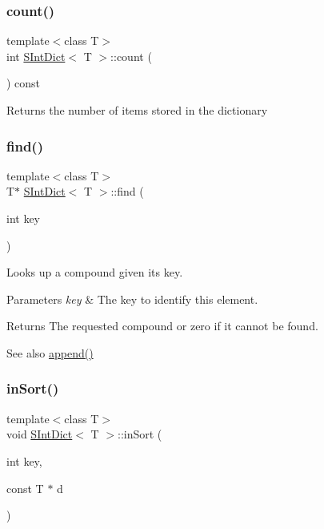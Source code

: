 \subsubsection{\texorpdfstring{count()}{count()}}
{\footnotesize\ttfamily template$<$class T$>$ \\
int \mbox{\hyperlink{class_s_int_dict}{S\+Int\+Dict}}$<$ T $>$\+::count (\begin{DoxyParamCaption}{ }\end{DoxyParamCaption}) const\hspace{0.3cm}{\ttfamily [inline]}}

Returns the number of items stored in the dictionary \mbox{\label{class_s_int_dict_a5b08deebe24072f66bdce4fed2a3863d}} 
\subsubsection{\texorpdfstring{find()}{find()}}
{\footnotesize\ttfamily template$<$class T$>$ \\
T$\ast$ \mbox{\hyperlink{class_s_int_dict}{S\+Int\+Dict}}$<$ T $>$\+::find (\begin{DoxyParamCaption}\item[{int}]{key }\end{DoxyParamCaption})\hspace{0.3cm}{\ttfamily [inline]}}

Looks up a compound given its key. 
\begin{DoxyParams}{Parameters}
{\em key} & The key to identify this element. \\
\hline
\end{DoxyParams}
\begin{DoxyReturn}{Returns}
The requested compound or zero if it cannot be found. 
\end{DoxyReturn}
\begin{DoxySeeAlso}{See also}
\mbox{\hyperlink{class_s_int_dict_a829c9e4c9827e765145d150ffb18b1ae}{append()}} 
\end{DoxySeeAlso}
\mbox{\label{class_s_int_dict_a16cc84888ede2d895d4df0323608862d}} 
\subsubsection{\texorpdfstring{inSort()}{inSort()}}
{\footnotesize\ttfamily template$<$class T$>$ \\
void \mbox{\hyperlink{class_s_int_dict}{S\+Int\+Dict}}$<$ T $>$\+::in\+Sort (\begin{DoxyParamCaption}\item[{int}]{key,  }\item[{const T $\ast$}]{d }\end{DoxyParamCaption})\hspace{0.3cm}{\ttfamily [inline]}}

